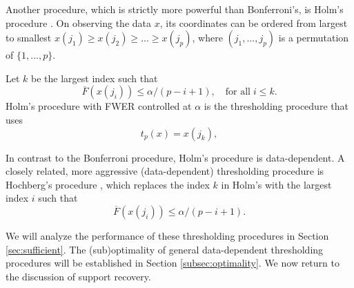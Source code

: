 Another procedure, which is strictly more powerful than Bonferroni's, is Holm's procedure \citep{holm1979simple}.
On observing the data $x$, its coordinates can be ordered from largest to smallest
$x(j_1) \ge x(j_2)  \ge \ldots \ge x(j_p)$,
where $(j_1, \ldots, j_p)$ is a permutation of $\{1, \ldots, p\}$. 
\begin{definition}
Let $k$ be the largest index such that
$$
\overline{F}(x(j_i)) \le \alpha / (p-i+1),\quad \text{for all}\;i\le k.
$$
Holm's procedure with FWER controlled at $\alpha$ is the thresholding procedure that uses
\begin{equation} \label{eq:Holm-procedure}
    t_p(x) = x(j_{k}),
\end{equation}
\end{definition}
In contrast to the Bonferroni procedure, Holm's procedure is data-dependent.
A closely related, more aggressive (data-dependent) thresholding procedure is Hochberg's procedure \citep{hochberg1988sharper},
which replaces the index $k$ in Holm's with the largest index $i$ such that
$$
\overline{F}(x(j_i)) \le \alpha / (p-i+1).
$$

We will analyze the performance of these thresholding procedures in Section \ref{sec:sufficient}.
The (sub)optimality of general data-dependent thresholding procedures will be established in Section \ref{subsec:optimality}.
We now return to the discussion of support recovery.

